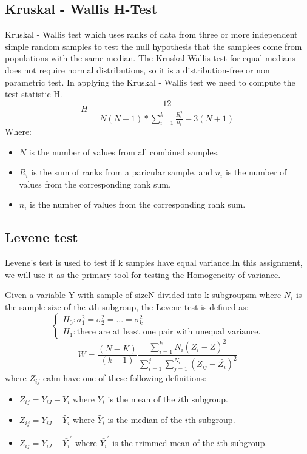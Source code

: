 \subsection{Kruskal - Wallis H-Test}
Kruskal - Wallis test which uses ranks of data from three or more independent simple random samples to test the null hypothesis that the samplees come from populations with the same median.
The Kruskal-Wallis test for equal medians does not require normal distributions, so it is a distribution-free or non parametric test. 
In applying the Kruskal - Wallis test we need to compute the test statistic H.
\[H = \frac{12}{N(N+1)*\sum_{i=1}^{k}\frac{R_i^2}{n_i}-3(N+1)}\]
Where:

\begin{itemize}
    \item $N$ is the number of values from all combined samples.
    \item $R_i$ is the sum of ranks from a paricular sample, and $n_i$ is the number of values from the corresponding rank sum.
    \item $n_i$ is the number of values from the corresponding rank sum.
\end{itemize}

\subsection{Levene test}
Levene's test is used to test if k samples have equal variance.In this assignment, we will use it as the primary tool for testing the Homogeneity of variance.

Given a variable Y with sample of sizeN divided into k subgroupsm where $N_i$ is the sample size of the $i$th subgroup, the Levene test is defined as:
\[
\begin{cases}
    H_0: \sigma_1^2 = \sigma_2^2 =...=\sigma_k^2 \\ 
    H_1: \text{there are at least one pair with unequal variance.}
\end{cases}
\]
\[W = \frac{(N-K)}{(k-1)}\frac{\sum_{i=1}^{k}N_i(\bar{Z_i}-\bar{Z})^2}{\sum_{i=1}^{j}\sum_{j=1}^{N_i}(Z_{ij}-\bar{Z_i})^2}\]
where $Z_{ij}$ cahn have one of these following definitions:

\begin{itemize}
    \item $Z_{ij} = Y_{iJ} - \bar{Y_i}$ where $\bar{Y_i}$ is the mean  of the $i$th subgroup.
    \item $Z_{ij} = Y_{iJ} - \tilde{Y_i}$ where $\tilde{Y_i}$ is the median of the $i$th subgroup.
    \item $Z_{ij} = Y_{iJ} - \bar{Y_i}^{'}$ where $\bar{Y_i}^{'}$ is the trimmed mean of the $i$th subgroup.
\end{itemize}

